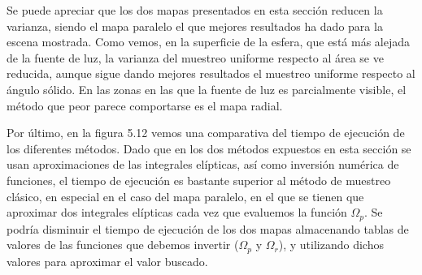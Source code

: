 Se puede apreciar que los dos mapas presentados en esta sección reducen la varianza, siendo el mapa paralelo el que mejores resultados ha dado para la escena mostrada. Como vemos, en la superficie de la esfera, que está más alejada de la fuente de luz, la varianza del muestreo uniforme respecto al área se ve reducida, aunque sigue dando mejores resultados el muestreo uniforme respecto al ángulo sólido. En las zonas en las que la fuente de luz es parcialmente visible, el método que peor parece comportarse es el mapa radial.

Por último, en la figura 5.12 vemos una comparativa del tiempo de ejecución de los diferentes métodos. Dado que en los dos métodos expuestos en esta sección se usan aproximaciones de las integrales elípticas, así como inversión numérica de funciones, el tiempo de ejecución es bastante superior al método de muestreo clásico, en especial en el caso del mapa paralelo, en el que se tienen que aproximar dos integrales elípticas cada vez que evaluemos la función $\Omega_p$. Se podría disminuir el tiempo de ejecución de los dos mapas almacenando tablas de valores de las funciones que debemos invertir ($\Omega_p$ y $\Omega_r$), y utilizando dichos valores para aproximar el valor buscado.

\newpage

